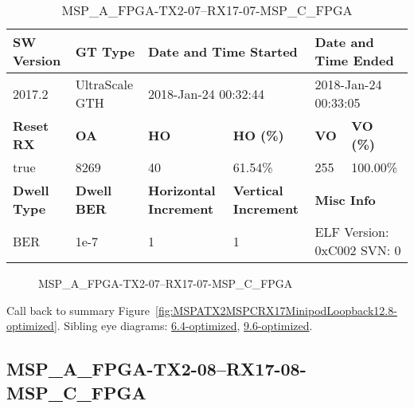 \begin{table}[h]
\centering
\caption{MSP\_A\_FPGA-TX2-07--RX17-07-MSP\_C\_FPGA}
\label{tab:MSPAFPGATX207RX1707MSPCFPGA12.8-optimized}
\begin{tabular}{@{}|l|l|l|l|l|l|@{}}
\toprule
\textbf{SW Version}                & \textbf{GT Type}   & \multicolumn{2}{l|}{\textbf{Date and Time Started}}            & \multicolumn{2}{l|}{\textbf{Date and Time Ended}}        \\ \midrule
2017.2                       & UltraScale GTH          & \multicolumn{2}{l|}{2018-Jan-24 00:32:44}                   & \multicolumn{2}{l|}{2018-Jan-24 00:33:05}               \\ \midrule
\textbf{Reset RX}                  & \textbf{OA} & \textbf{HO}   & \textbf{HO (\%)} & \textbf{VO} & \textbf{VO (\%)} \\ \midrule
true & 8269        & 40          & 61.54\%        & 255        & 100.00\%       \\ \midrule
\textbf{Dwell Type}                & \textbf{Dwell BER} & \textbf{Horizontal Increment} & \textbf{Vertical Increment}    & \multicolumn{2}{l|}{\textbf{Misc Info}}                  \\ \midrule
BER                            & 1e-7        & 1        & 1           & \multicolumn{2}{l|}{ELF Version: 0xC002 SVN: 0}                         \\ \bottomrule
\end{tabular}
\end{table}

\begin{figure}[h]
\caption{MSP\_A\_FPGA-TX2-07--RX17-07-MSP\_C\_FPGA} \label{fig:MSPAFPGATX207RX1707MSPCFPGA12.8-optimized}
\end{figure}

Call back to summary Figure~\ref{fig:MSPATX2MSPCRX17MinipodLoopback12.8-optimized}.
Sibling eye diagrams: \hyperref[sec:MSPAFPGATX207RX1707MSPCFPGA6.4-optimized]{6.4-optimized}, \hyperref[sec:MSPAFPGATX207RX1707MSPCFPGA9.6-optimized]{9.6-optimized}.

\clearpage
\newpage


\subsection{MSP\_A\_FPGA-TX2-08--RX17-08-MSP\_C\_FPGA}\label{sec:MSPAFPGATX208RX1708MSPCFPGA12.8-optimized}

